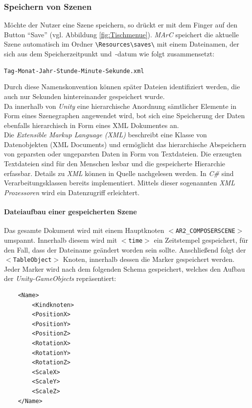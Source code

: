 \subsubsection{Speichern von Szenen}\label{Speichern}
Möchte der Nutzer eine Szene speichern, so drückt er mit dem Finger auf den Button "`Save"' (vgl. Abbildung \ref{fig:Tischmenue}). \textit{MArC} speichert die aktuelle Szene automatisch im Ordner \texttt{\textbackslash Resources\textbackslash saves\textbackslash} mit einem Dateinamen, der sich aus dem Speicherzeitpunkt und~-datum wie folgt zusammensetzt:
\begin{center}
	\texttt{Tag-Monat-Jahr-Stunde-Minute-Sekunde.xml}
\end{center}
Durch diese Namenskonvention können später Dateien identifiziert werden, die auch nur Sekunden hintereinander gespeichert wurde.\\
Da innerhalb von \textit{Unity} eine hierarchische Anordnung sämtlicher Elemente in Form eines Szenegraphen angewendet wird, bot sich eine Speicherung der Daten ebenfalls hierarchisch in Form eines XML Dokumentes an.\\
Die \textit{Extensible Markup Language (XML)} beschreibt eine Klasse von Datenobjekten (XML Documents) und ermöglicht das hierarchische Abspeichern von geparsten oder ungeparsten Daten in Form von Textdateien. Die erzeugten Textdateien sind für den Menschen lesbar und die gespeicherte Hierarchie erfassbar. Details zu \textit{XML} können in Quelle \cite{bray1998extensible} nachgelesen werden. In \textit{C\#} sind Verarbeitungsklassen bereits implementiert. Mittels dieser sogenannten \textit{XML Prozessoren} wird ein Datenzugriff erleichtert.

\paragraph{Dateiaufbau einer gespeicherten Szene}
Das gesamte Dokument wird mit einem Hauptknoten \texttt{$<$AR2\_COMPOSERSCENE$>$} umspannt. Innerhalb diesem wird mit \texttt{$<$time$>$}
ein Zeitstempel gespeichert, für den Fall, dass der Dateiname geändert worden sein sollte.
Anschließend folgt der \texttt{$<$TableObject$>$} Knoten, innerhalb dessen die Marker gespeichert werden. Jeder Marker wird nach dem folgenden Schema gespeichert, welches den Aufbau der \emph{Unity-GameObjects} repräsentiert:

 \begin{lstlisting}
	<Name>
		<Kindknoten>
		<PositionX>
		<PositionY>
		<PositionZ>
		<RotationX>
		<RotationY>
		<RotationZ>
		<ScaleX>
		<ScaleY>
		<ScaleZ>
	</Name>
 \end{lstlisting}

